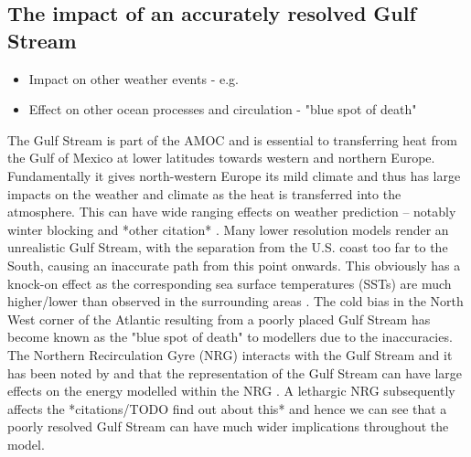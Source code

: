 \documentclass[a4paper,11pt]{article}
\begin{document}
\subsection{The impact of an accurately resolved Gulf Stream}
\begin{itemize}
  \item Impact on other weather events - e.g.  \citep{Scaife2011a}
  \item Effect on other ocean processes and circulation - "blue spot of death"    %
\end{itemize}
The Gulf Stream is part of the AMOC and is essential to transferring heat from the Gulf of Mexico at lower latitudes towards western and northern Europe. Fundamentally it gives north-western Europe its mild climate and thus has large impacts on the weather and climate as the heat is transferred into the atmosphere. This can have wide ranging effects on weather prediction – notably winter blocking \citep{Scaife2011a} and *other citation* . Many lower resolution models render an unrealistic Gulf Stream, with the separation from the U.S. coast too far to the South, causing an inaccurate path from this point onwards. This obviously has a knock-on effect as the corresponding sea surface temperatures (SSTs) are much higher/lower than observed in the surrounding areas \citep{Greatbatch2004}. The cold bias in the North West corner of the Atlantic resulting from a poorly placed Gulf Stream has become known as the "blue spot of death" \citep{Gnanadesikan2007} to modellers due to the inaccuracies. The Northern Recirculation Gyre (NRG) interacts with the Gulf Stream and it has been noted by \citep{Zhang2007} and \citep{Ezer2016b} that the representation of the Gulf Stream can have large effects on the energy modelled within the NRG . A lethargic NRG subsequently affects the *citations/TODO find out about this* and hence we can see that a poorly resolved Gulf Stream can have much wider implications throughout the model.
\end{document}
